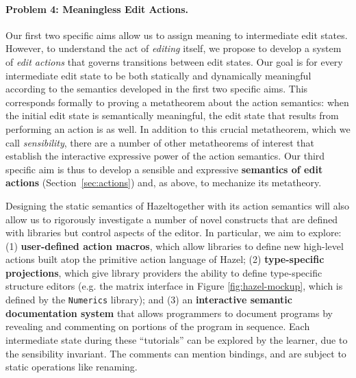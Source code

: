 \documentclass[letterpaper,USenglish]{lipics-v2016}
\let\li\lstinline
\newcommand{\Hazel}[0]{\textsf{Hazel}}
\newcommand{\HazelEnv}[0]{\Hazel}
\begin{document}
\paragraph{Problem 4: Meaningless Edit Actions.} Our first two specific aims
allow us to assign meaning to intermediate edit states. However, to
understand the act of \emph{editing} itself, we propose to develop a system of
\emph{edit actions} that governs transitions between edit
states. Our goal is for every intermediate edit state to be both statically and
dynamically meaningful according to the semantics developed in the first two
specific aims. This corresponds formally to proving a
metatheorem about the action semantics: when the initial edit state is
semantically meaningful, the edit state that results from performing an action
is as well. In addition to this crucial metatheorem, which
we call \emph{sensibility}, there are a number of other metatheorems of interest
that establish the interactive expressive power of the action semantics. Our third specific
aim is thus to develop a sensible and expressive \textbf{semantics of edit actions} (Section~\ref{sec:actions})
and, as above, to mechanize its metatheory.

Designing the static semantics of \HazelEnv together with its action semantics 
will also allow us to rigorously investigate a number of novel constructs that 
are defined with libraries but control aspects of the editor. In particular, we aim to explore:
(1) \textbf{user-defined action macros}, which allow libraries to define new high-level
actions built atop the primitive action language of \HazelEnv; (2) \textbf{type-specific
projections}, which give library providers the ability to define type-specific structure editors (e.g. the matrix interface in Figure \ref{fig:hazel-mockup}, which is defined  
by the \li{Numerics} library); and (3) an \textbf{interactive semantic documentation system} that
allows programmers to document programs by revealing and commenting on portions of the 
program in sequence. Each intermediate state during these ``tutorials'' can be explored 
by the learner, due to the sensibility invariant. The comments can mention bindings, and are 
subject to static operations like renaming.
\end{document}
